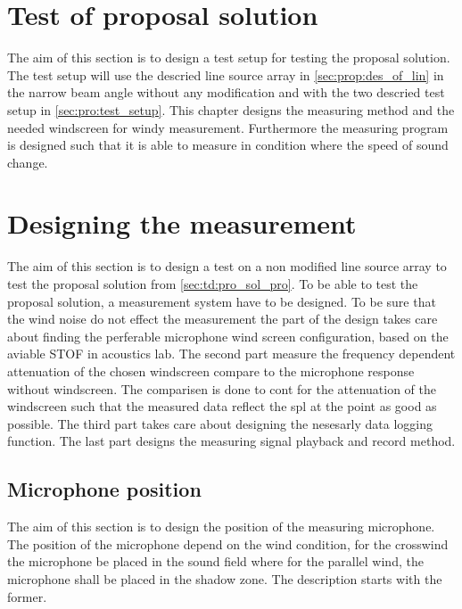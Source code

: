\section{Test of proposal solution}
The aim of this section is to design a test setup for testing the proposal solution. The test setup will use the descried line source array in \autoref{sec:prop:des_of_lin} in the narrow beam angle without any modification and with the two descried test setup in \autoref{sec:pro:test_setup}. This chapter designs the measuring method and the needed windscreen for windy measurement. Furthermore the measuring program is designed such that it is able to measure in condition where the speed of sound change.


\section{Designing the measurement}
The aim of this section is to design a test on a non modified line source array to test the proposal solution from \autoref{sec:td:pro_sol_pro}. To be able to test the proposal solution, a measurement system have to be designed. To be sure that the wind noise do not effect the measurement the part of the design takes care about finding the perferable microphone wind screen configuration, based on the aviable STOF in acoustics lab. The second part measure the frequency dependent attenuation of the chosen windscreen compare to the microphone response without windscreen. The comparisen is done to cont for the attenuation of the windscreen such that the measured data reflect the \gls{spl} at the point as good as possible. The third part takes care about designing the nesesarly data logging function. The last part designs the measuring signal playback and record method.

\subsection{Microphone position}
The aim of this section is to design the position of the measuring microphone. The position of the microphone depend on the wind condition, for the crosswind the microphone be placed in the sound field where for the parallel wind, the microphone shall be placed in the shadow zone. The description starts with the former.


